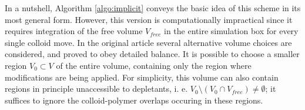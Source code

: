 In a nutshell, Algorithm \ref{algo:implicit} conveys the basic idea of this scheme in its most general form. However, this version is computationally impractical since it requires integration of the free volume $V_{free}$ in the entire simulation box for every single colloid move. In the original article \cite{glaser2015parallel} several alternative volume choices are considered, and proved to obey detailed balance. It is possible to choose a smaller region $V_0 \subset V$ of the entire volume, containing only the region where modifications are being applied. For simplicity, this volume can also contain regions in principle unaccessible to depletants, i. e. $V_0 \setminus (V_0 \cap V_{free}) \neq \emptyset$; it suffices to ignore the colloid-polymer overlaps occuring in these regions.



\clearpage